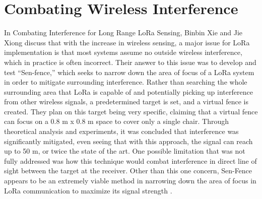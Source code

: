 \documentclass[sigsmall]{acmart}
\begin{document}
\section*{Combating Wireless Interference}
In Combating Interference for Long Range LoRa Sensing, Binbin Xie and Jie Xiong discuss that with the increase in wireless sensing, a major issue for LoRa implementation is that most systems assume no outside wireless interference, which in practice is often incorrect. Their answer to this issue was to develop and test “Sen-fence,” which seeks to narrow down the area of focus of a LoRa system in order to mitigate surrounding interference. Rather than searching the whole surrounding area that LoRa is capable of and potentially picking up interference from other wireless signals, a predetermined target is set, and a virtual fence is created. They plan on this target being very specific, claiming that a virtual fence can focus on a 0.8 m x 0.8 m space to cover only a single chair. Through theoretical analysis and experiments, it was concluded that interference was significantly mitigated, even seeing that with this approach, the signal can reach up to 50 m, or twice the state of the art. One possible limitation that was not fully addressed was how this technique would combat interference in direct line of sight between the target at the receiver. Other than this one concern, Sen-Fence appears to be an extremely viable method in narrowing down the area of focus in LoRa communication to maximize its signal strength  \cite{10.1145/3384419.3430731}.  
\end{document}
